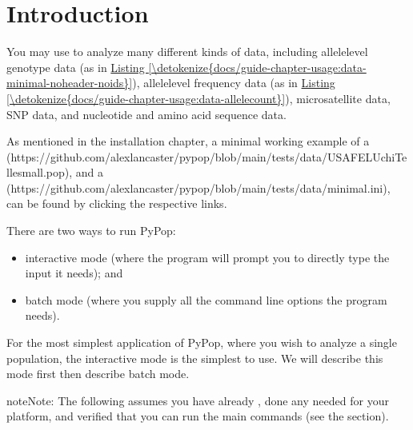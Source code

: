 \documentclass[letterpaper,10pt,english,openany,oneside]{sphinxmanual}
\begin{document}
\section{Introduction}
\label{\detokenize{docs/guide-chapter-usage:introduction}}
\sphinxAtStartPar
You may use  to analyze many different kinds of data, including
allele\sphinxhyphen{}level genotype data (as in \hyperref[\detokenize{docs/guide-chapter-usage:data-minimal-noheader-noids}]{Listing \ref{\detokenize{docs/guide-chapter-usage:data-minimal-noheader-noids}}}), allele\sphinxhyphen{}level
frequency data (as in \hyperref[\detokenize{docs/guide-chapter-usage:data-allelecount}]{Listing \ref{\detokenize{docs/guide-chapter-usage:data-allelecount}}}),
microsatellite data, SNP data, and nucleotide and amino acid sequence
data.

\sphinxAtStartPar
As mentioned in the installation chapter, a minimal working example
of a  (https://github.com/alexlancaster/pypop/blob/main/tests/data/USAFEL\sphinxhyphen{}UchiTelle\sphinxhyphen{}small.pop),
and a  (https://github.com/alexlancaster/pypop/blob/main/tests/data/minimal.ini),
can be found by clicking the respective links.

\sphinxAtStartPar
There are two ways to run PyPop:
\begin{itemize}
\item {} 
\sphinxAtStartPar
interactive mode (where the program will prompt you to directly type
the input it needs); and

\item {} 
\sphinxAtStartPar
batch mode (where you supply all the command line options the program
needs).

\end{itemize}

\sphinxAtStartPar
For the most simplest application of PyPop, where you wish to analyze
a single population, the interactive mode is the simplest to use. We
will describe this mode first then describe batch mode.

\begin{sphinxadmonition}{note}{Note:}
\sphinxAtStartPar
The following assumes you have already {\hyperref[\detokenize{docs/guide-chapter-install:installing-pypop}]{}}, done any {\hyperref[\detokenize{docs/guide-chapter-install:post-install-path-adjustments}]{}} needed for your platform, and
verified that you can run the main commands (see the
{\hyperref[\detokenize{docs/guide-chapter-install:examples}]{}} section).
\end{sphinxadmonition}
\end{document}
